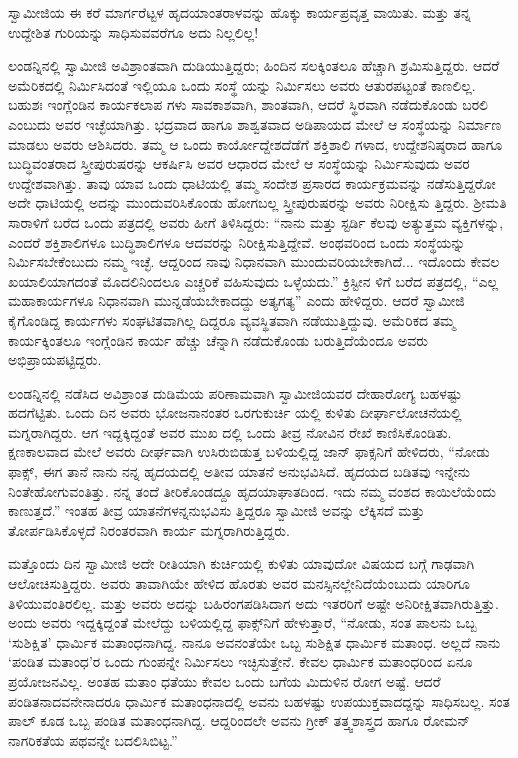 ಸ್ವಾಮೀಜಿಯ ಈ ಕರೆ ಮಾರ್ಗರೆಟ್ಟಳ ಹೃದಯಾಂತರಾಳವನ್ನು ಹೊಕ್ಕು ಕಾರ್ಯಪ್ರವೃತ್ತ ವಾಯಿತು. ಮತ್ತು ತನ್ನ ಉದ್ದೇಶಿತ ಗುರಿಯನ್ನು ಸಾಧಿಸುವವರೆಗೂ ಅದು ನಿಲ್ಲಲಿಲ್ಲ!

ಲಂಡನ್ನಿನಲ್ಲಿ ಸ್ವಾಮೀಜಿ ಅವಿಶ್ರಾಂತವಾಗಿ ದುಡಿಯುತ್ತಿದ್ದರು; ಹಿಂದಿನ ಸಲಕ್ಕಿಂತಲೂ ಹೆಚ್ಚಾಗಿ ಶ್ರಮಿಸುತ್ತಿದ್ದರು. ಆದರೆ ಅಮೆರಿಕದಲ್ಲಿ ನಿರ್ಮಿಸಿದಂತೆ ಇಲ್ಲಿಯೂ ಒಂದು ಸಂಸ್ಥೆ ಯನ್ನು ನಿರ್ಮಿಸಲು ಅವರು ಆತುರಪಟ್ಟಂತೆ ಕಾಣಲಿಲ್ಲ. ಬಹುಶಃ ಇಂಗ್ಲೆಂಡಿನ ಕಾರ್ಯಕಲಾಪ ಗಳು ಸಾವಕಾಶವಾಗಿ, ಶಾಂತವಾಗಿ, ಆದರೆ ಸ್ಥಿರವಾಗಿ ನಡೆದುಕೊಂಡು ಬರಲಿ ಎಂಬುದು ಅವರ ಇಚ್ಛೆಯಾಗಿತ್ತು. ಭದ್ರವಾದ ಹಾಗೂ ಶಾಶ್ವತವಾದ ಅಡಿಪಾಯದ ಮೇಲೆ ಆ ಸಂಸ್ಥೆಯನ್ನು ನಿರ್ಮಾಣ ಮಾಡಲು ಅವರು ಆಶಿಸಿದರು. ತಮ್ಮ ಆ ಒಂದು ಕಾರ್ಯೋದ್ದೇಶದೆಡೆಗೆ ಶಕ್ತಿಶಾಲಿ ಗಳಾದ, ಉದ್ದೇಶನಿಷ್ಠರಾದ ಹಾಗೂ ಬುದ್ಧಿವಂತರಾದ ಸ್ತ್ರೀಪುರುಷರನ್ನು ಆಕರ್ಷಿಸಿ ಅವರ ಆಧಾರದ ಮೇಲೆ ಆ ಸಂಸ್ಥೆಯನ್ನು ನಿರ್ಮಿಸುವುದು ಅವರ ಉದ್ದೇಶವಾಗಿತ್ತು. ತಾವು ಯಾವ ಒಂದು ಧಾಟಿಯಲ್ಲಿ ತಮ್ಮ ಸಂದೇಶ ಪ್ರಸಾರದ ಕಾರ್ಯಕ್ರಮವನ್ನು ನಡೆಸುತ್ತಿದ್ದರೋ ಅದೇ ಧಾಟಿಯಲ್ಲಿ ಅದನ್ನು ಮುಂದುವರಿಸಿಕೊಂಡು ಹೋಗಬಲ್ಲ ಸ್ತ್ರೀಪುರುಷರನ್ನು ಅವರು ನಿರೀಕ್ಷಿಸು ತ್ತಿದ್ದರು. ಶ್ರೀಮತಿ ಸಾರಾಳಿಗೆ ಬರೆದ ಒಂದು ಪತ್ರದಲ್ಲಿ ಅವರು ಹೀಗೆ ತಿಳಿಸಿದ್ದರು: “ನಾನು ಮತ್ತು ಸ್ಟರ್ಡಿ ಕೆಲವು ಅತ್ಯುತ್ತಮ ವ್ಯಕ್ತಿಗಳನ್ನು, ಎಂದರೆ ಶಕ್ತಿಶಾಲಿಗಳೂ ಬುದ್ಧಿಶಾಲಿಗಳೂ ಆದವರನ್ನು ನಿರೀಕ್ಷಿಸುತ್ತಿದ್ದೇವೆ. ಅಂಥವರಿಂದ ಒಂದು ಸಂಸ್ಥೆಯನ್ನು ನಿರ್ಮಿಸಬೇಕೆಂಬುದು ನಮ್ಮ ಇಚ್ಛೆ. ಆದ್ದರಿಂದ ನಾವು ನಿಧಾನವಾಗಿ ಮುಂದುವರಿಯಬೇಕಾಗಿದೆ... ಇದೊಂದು ಕೇವಲ ಖಯಾಲಿಯಾಗದಂತೆ ಮೊದಲಿನಿಂದಲೂ ಎಚ್ಚರಿಕೆ ವಹಿಸುವುದು ಒಳ್ಳೆಯದು.” ಕ್ರಿಸ್ಟೀನ ಳಿಗೆ ಬರೆದ ಪತ್ರದಲ್ಲಿ, “ಎಲ್ಲ ಮಹಾಕಾರ್ಯಗಳೂ ನಿಧಾನವಾಗಿ ಮುನ್ನಡೆಯಬೇಕಾದದ್ದು ಅತ್ಯಗತ್ಯ” ಎಂದು ಹೇಳಿದ್ದರು. ಆದರೆ ಸ್ವಾಮೀಜಿ ಕೈಗೊಂಡಿದ್ದ ಕಾರ್ಯಗಳು ಸಂಘಟಿತವಾಗಿಲ್ಲ ದಿದ್ದರೂ ವ್ಯವಸ್ಥಿತವಾಗಿ ನಡೆಯುತ್ತಿದ್ದುವು. ಅಮೆರಿಕದ ತಮ್ಮ ಕಾರ್ಯಕ್ಕಿಂತಲೂ ಇಂಗ್ಲೆಂಡಿನ ಕಾರ್ಯ ಹೆಚ್ಚು ಚೆನ್ನಾಗಿ ನಡೆದುಕೊಂಡು ಬರುತ್ತಿದೆಯೆಂದೂ ಅವರು ಅಭಿಪ್ರಾಯಪಟ್ಟಿದ್ದರು.

ಲಂಡನ್ನಿನಲ್ಲಿ ನಡೆಸಿದ ಅವಿಶ್ರಾಂತ ದುಡಿಮೆಯ ಪರಿಣಾಮವಾಗಿ ಸ್ವಾಮೀಜಿಯವರ ದೇಹಾರೋಗ್ಯ ಬಹಳಷ್ಟು ಹದಗೆಟ್ಟಿತು. ಒಂದು ದಿನ ಅವರು ಭೋಜನಾನಂತರ ಒರಗುಕುರ್ಚಿ ಯಲ್ಲಿ ಕುಳಿತು ದೀರ್ಘಾಲೋಚನೆಯಲ್ಲಿ ಮಗ್ನರಾಗಿದ್ದರು. ಆಗ ಇದ್ದಕ್ಕಿದ್ದಂತೆ ಅವರ ಮುಖ ದಲ್ಲಿ ಒಂದು ತೀವ್ರ ನೋವಿನ ರೇಖೆ ಕಾಣಿಸಿಕೊಂಡಿತು. ಕ್ಷಣಕಾಲವಾದ ಮೇಲೆ ಅವರು ದೀರ್ಘವಾಗಿ ಉಸಿರುಬಿಡುತ್ತ ಬಳಿಯಲ್ಲಿದ್ದ ಜಾನ್ ಫಾಕ್ಸನಿಗೆ ಹೇಳಿದರು, “ನೋಡು ಫಾಕ್ಸ್, ಈಗ ತಾನೆ ನಾನು ನನ್ನ ಹೃದಯದಲ್ಲಿ ಅತೀವ ಯಾತನೆ ಅನುಭವಿಸಿದೆ. ಹೃದಯದ ಬಡಿತವು ಇನ್ನೇನು ನಿಂತೇಹೋಗುವಂತಿತ್ತು. ನನ್ನ ತಂದೆ ತೀರಿಕೊಂಡದ್ದೂ ಹೃದಯಾಘಾತದಿಂದ. ಇದು ನಮ್ಮ ವಂಶದ ಕಾಯಿಲೆಯೆಂದು ಕಾಣುತ್ತದೆ.” ಇಂತಹ ತೀವ್ರ ಯಾತನೆಗಳನ್ನನುಭವಿಸು ತ್ತಿದ್ದರೂ ಸ್ವಾಮೀಜಿ ಅವನ್ನು ಲೆಕ್ಕಿಸದೆ ಮತ್ತು ತೋರ್ಪಡಿಸಿಕೊಳ್ಳದೆ ನಿರಂತರವಾಗಿ ಕಾರ್ಯ ಮಗ್ನರಾಗಿರುತ್ತಿದ್ದರು.

ಮತ್ತೊಂದು ದಿನ ಸ್ವಾಮೀಜಿ ಅದೇ ರೀತಿಯಾಗಿ ಕುರ್ಚಿಯಲ್ಲಿ ಕುಳಿತು ಯಾವುದೋ ವಿಷಯದ ಬಗ್ಗೆ ಗಾಢವಾಗಿ ಆಲೋಚಿಸುತ್ತಿದ್ದರು. ಅವರು ತಾವಾಗಿಯೇ ಹೇಳಿದ ಹೊರತು ಅವರ ಮನಸ್ಸಿನಲ್ಲೇನಿದೆಯೆಂಬುದು ಯಾರಿಗೂ ತಿಳಿಯುವಂತಿರಲಿಲ್ಲ. ಮತ್ತು ಅವರು ಅದನ್ನು ಬಹಿರಂಗಪಡಿಸಿದಾಗ ಅದು ಇತರರಿಗೆ ಅಷ್ಟೇ ಅನಿರೀಕ್ಷಿತವಾಗಿರುತ್ತಿತ್ತು. ಅಂದು ಅವರು ಇದ್ದಕ್ಕಿದ್ದಂತೆ ಮೇಲೆದ್ದು ಬಳಿಯಲ್ಲಿದ್ದ ಫಾಕ್ಸ್​ನಿಗೆ ಹೇಳುತ್ತಾರೆ, “ನೋಡು, ಸಂತ ಪಾಲನು ಒಬ್ಬ ‘ಸುಶಿಕ್ಷಿತ’ ಧಾರ್ಮಿಕ ಮತಾಂಧನಾಗಿದ್ದ. ನಾನೂ ಅವನಂತೆಯೇ ಒಬ್ಬ ಸುಶಿಕ್ಷಿತ ಧಾರ್ಮಿಕ ಮತಾಂಧ. ಅಲ್ಲದೆ ನಾನು ‘ಪಂಡಿತ ಮತಾಂಧ’ರ ಒಂದು ಗುಂಪನ್ನೇ ನಿರ್ಮಿಸಲು ಇಚ್ಛಿಸುತ್ತೇನೆ. ಕೇವಲ ಧಾರ್ಮಿಕ ಮತಾಂಧರಿಂದ ಏನೂ ಪ್ರಯೋಜನವಿಲ್ಲ. ಅಂತಹ ಮತಾಂ ಧತೆಯು ಕೇವಲ ಒಂದು ಬಗೆಯ ಮಿದುಳಿನ ರೋಗ ಅಷ್ಟೆ. ಆದರೆ ಪಂಡಿತನಾದವನೇನಾದರೂ ಧಾರ್ಮಿಕ ಮತಾಂಧನಾದಲ್ಲಿ ಅವನು ಬಹಳಷ್ಟು ಉಪಯುಕ್ತವಾದದ್ದನ್ನು ಸಾಧಿಸಬಲ್ಲ. ಸಂತ ಪಾಲ್ ಕೂಡ ಒಬ್ಬ ಪಂಡಿತ ಮತಾಂಧನಾಗಿದ್ದ. ಆದ್ದರಿಂದಲೇ ಅವನು ಗ್ರೀಕ್ ತತ್ತ್ವಶಾಸ್ತ್ರದ ಹಾಗೂ ರೋಮನ್ ನಾಗರಿಕತೆಯ ಪಥವನ್ನೇ ಬದಲಿಸಿಬಿಟ್ಟ.”

